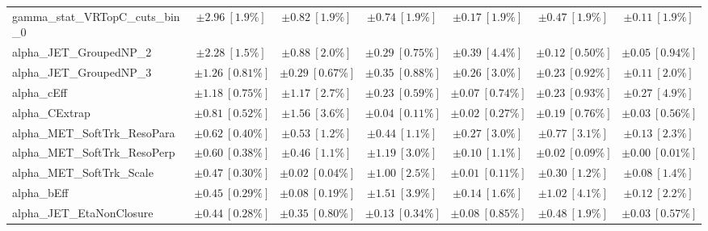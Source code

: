 \begin{sidewaystable}
\begin{center}
\begin{tabular*}{\textwidth}{@{\extracolsep{\fill}}lcccccc}
gamma\_stat\_VRTopC\_cuts\_bin\_0         & $\pm 2.96\ [1.9\%] $          & $\pm 0.82\ [1.9\%] $          & $\pm 0.74\ [1.9\%] $          & $\pm 0.17\ [1.9\%] $          & $\pm 0.47\ [1.9\%] $          & $\pm 0.11\ [1.9\%] $       \\
alpha\_JET\_GroupedNP\_2         & $\pm 2.28\ [1.5\%] $          & $\pm 0.88\ [2.0\%] $          & $\pm 0.29\ [0.75\%] $          & $\pm 0.39\ [4.4\%] $          & $\pm 0.12\ [0.50\%] $          & $\pm 0.05\ [0.94\%] $       \\
alpha\_JET\_GroupedNP\_3         & $\pm 1.26\ [0.81\%] $          & $\pm 0.29\ [0.67\%] $          & $\pm 0.35\ [0.88\%] $          & $\pm 0.26\ [3.0\%] $          & $\pm 0.23\ [0.92\%] $          & $\pm 0.11\ [2.0\%] $       \\
alpha\_cEff         & $\pm 1.18\ [0.75\%] $          & $\pm 1.17\ [2.7\%] $          & $\pm 0.23\ [0.59\%] $          & $\pm 0.07\ [0.74\%] $          & $\pm 0.23\ [0.93\%] $          & $\pm 0.27\ [4.9\%] $       \\
alpha\_CExtrap         & $\pm 0.81\ [0.52\%] $          & $\pm 1.56\ [3.6\%] $          & $\pm 0.04\ [0.11\%] $          & $\pm 0.02\ [0.27\%] $          & $\pm 0.19\ [0.76\%] $          & $\pm 0.03\ [0.56\%] $       \\
alpha\_MET\_SoftTrk\_ResoPara         & $\pm 0.62\ [0.40\%] $          & $\pm 0.53\ [1.2\%] $          & $\pm 0.44\ [1.1\%] $          & $\pm 0.27\ [3.0\%] $          & $\pm 0.77\ [3.1\%] $          & $\pm 0.13\ [2.3\%] $       \\
alpha\_MET\_SoftTrk\_ResoPerp         & $\pm 0.60\ [0.38\%] $          & $\pm 0.46\ [1.1\%] $          & $\pm 1.19\ [3.0\%] $          & $\pm 0.10\ [1.1\%] $          & $\pm 0.02\ [0.09\%] $          & $\pm 0.00\ [0.01\%] $       \\
alpha\_MET\_SoftTrk\_Scale         & $\pm 0.47\ [0.30\%] $          & $\pm 0.02\ [0.04\%] $          & $\pm 1.00\ [2.5\%] $          & $\pm 0.01\ [0.11\%] $          & $\pm 0.30\ [1.2\%] $          & $\pm 0.08\ [1.4\%] $       \\
alpha\_bEff         & $\pm 0.45\ [0.29\%] $          & $\pm 0.08\ [0.19\%] $          & $\pm 1.51\ [3.9\%] $          & $\pm 0.14\ [1.6\%] $          & $\pm 1.02\ [4.1\%] $          & $\pm 0.12\ [2.2\%] $       \\
alpha\_JET\_EtaNonClosure         & $\pm 0.44\ [0.28\%] $          & $\pm 0.35\ [0.80\%] $          & $\pm 0.13\ [0.34\%] $          & $\pm 0.08\ [0.85\%] $          & $\pm 0.48\ [1.9\%] $          & $\pm 0.03\ [0.57\%] $       \\

\end{tabular*}
\end{center}
\end{sidewaystable}
